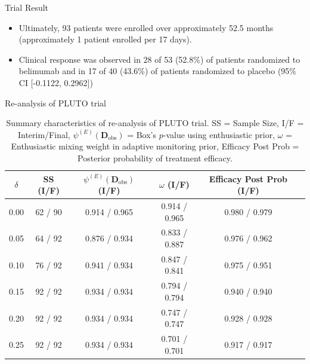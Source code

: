 \documentclass{beamer}
\begin{document}
\begin{frame}{Trial Result}
\begin{itemize}
\item Ultimately, 93 patients were enrolled over approximately 52.5 months (approximately 1 patient enrolled per 17 days).
%
\item Clinical response was observed in 28 of 53 (52.8\%) of patients randomized to belimumab and in 17 of 40 (43.6\%) of patients randomized to placebo (95\% CI [-0.1122, 0.2962])
\end{itemize}
\end{frame}

\begin{frame}{Re-analysis of PLUTO trial}
\footnotesize
\begin{table}[htbp]\label{tbl:real-pluto}%
\centering
\caption{Summary characteristics of re-analysis of PLUTO trial. SS = Sample Size, I/F = Interim/Final, $\psi^{(E)}(\mathbf{D}_{\text{obs}})$ = Box's $p$-value using enthusiastic prior, $\omega$ = Enthusiastic mixing weight in adaptive monitoring prior, Efficacy Post Prob = Posterior probability of treatment efficacy.}%
\begin{tabular*}{300pt}{@{\extracolsep\fill}cccccc@{\extracolsep\fill}}%
\toprule
$\delta$	&	SS (I/F)			&	$\psi^{(E)}(\mathbf{D}_{\text{obs}})$ (I/F)			&	$\omega$ (I/F)			&	Efficacy Post Prob (I/F)			\\
\midrule
0.00	&	62	/	90	&	0.914	/	0.965	&	0.914	/	0.965	&	0.980	/	0.979	\\
0.05	&	64	/	92	&	0.876	/	0.934	&	0.833	/	0.887	&	0.976	/	0.962	\\
0.10	&	76	/	92	&	0.941	/	0.934	&	0.847	/	0.841	&	0.975	/	0.951	\\
0.15	&	92	/	92	&	0.934	/	0.934	&	0.794	/	0.794	&	0.940	/	0.940	\\
0.20	&	92	/	92	&	0.934	/	0.934	&	0.747	/	0.747	&	0.928	/	0.928	\\
0.25	&	92	/	92	&	0.934	/	0.934	&	0.701	/	0.701	&	0.917	/	0.917	\\
\bottomrule
\end{tabular*}
\end{table}
\end{frame}
\end{document}
